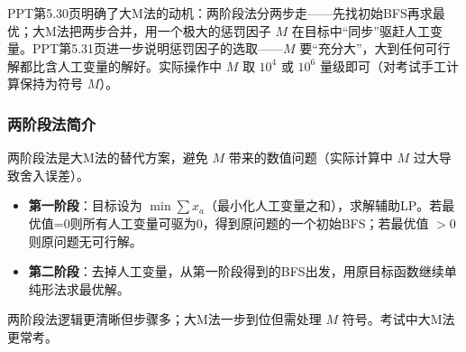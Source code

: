 PPT第5.30页明确了大M法的动机：两阶段法分两步走——先找初始BFS再求最优；大M法把两步合并，用一个极大的惩罚因子 $M$ 在目标中“同步”驱赶人工变量。PPT第5.31页进一步说明惩罚因子的选取——$M$ 要“充分大”，大到任何可行解都比含人工变量的解好。实际操作中 $M$ 取 $10^4$ 或 $10^6$ 量级即可（对考试手工计算保持为符号 $M$）。

\medskip
{}
\medskip
{}
\medskip

\subsubsection{两阶段法简介}

两阶段法是大M法的替代方案，避免 $M$ 带来的数值问题（实际计算中 $M$ 过大导致舍入误差）。
\begin{itemize}
  \item \textbf{第一阶段}：目标设为 $\min\sum x_a$（最小化人工变量之和），求解辅助LP。若最优值=0则所有人工变量可驱为0，得到原问题的一个初始BFS；若最优值 $>0$ 则原问题无可行解。
  \item \textbf{第二阶段}：去掉人工变量，从第一阶段得到的BFS出发，用原目标函数继续单纯形法求最优解。
\end{itemize}
两阶段法逻辑更清晰但步骤多；大M法一步到位但需处理 $M$ 符号。考试中大M法更常考。

